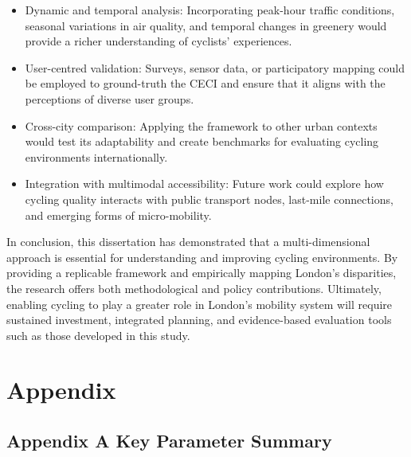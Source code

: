 \documentclass[
  12pt,
  oneside]{book}
\providecommand{\tightlist}{%
  \setlength{\itemsep}{0pt}\setlength{\parskip}{0pt}}
\begin{document}
\begin{itemize}
\tightlist
\item
  Dynamic and temporal analysis: Incorporating peak-hour traffic conditions, seasonal variations in air quality, and temporal changes in greenery would provide a richer understanding of cyclists' experiences.\\
\item
  User-centred validation: Surveys, sensor data, or participatory mapping could be employed to ground-truth the CECI and ensure that it aligns with the perceptions of diverse user groups.\\
\item
  Cross-city comparison: Applying the framework to other urban contexts would test its adaptability and create benchmarks for evaluating cycling environments internationally.\\
\item
  Integration with multimodal accessibility: Future work could explore how cycling quality interacts with public transport nodes, last-mile connections, and emerging forms of micro-mobility.
\end{itemize}

In conclusion, this dissertation has demonstrated that a multi-dimensional approach is essential for understanding and improving cycling environments. By providing a replicable framework and empirically mapping London's disparities, the research offers both methodological and policy contributions. Ultimately, enabling cycling to play a greater role in London's mobility system will require sustained investment, integrated planning, and evidence-based evaluation tools such as those developed in this study.

\printbibliography

\chapter*{Appendix}\label{appendix}

\section*{Appendix A Key Parameter Summary}\label{appendix-a-key-parameter-summary}

\end{document}

